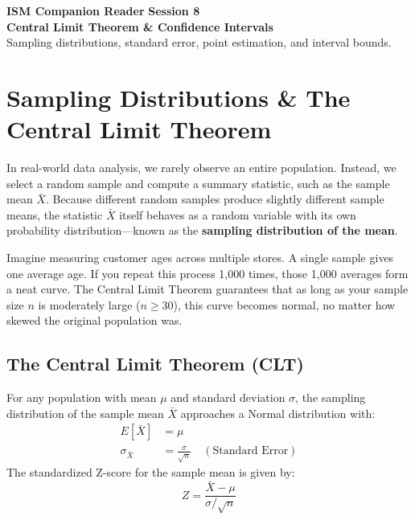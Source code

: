 \documentclass[10pt,a4paper]{article}
\begin{document}
\begin{tcolorbox}[enhanced, colback=brandink, colframe=brandink, arc=0pt, left=12pt, right=12pt, top=12pt, bottom=12pt]
  \color{white}
  \large\textbf{ISM Companion Reader} \hfill \textbf{Session 8}\\[4pt]
  \huge\textbf{Central Limit Theorem \& Confidence Intervals}\\[4pt]
  \small Sampling distributions, standard error, point estimation, and interval bounds.
\end{tcolorbox}

\vspace{10pt}

\section{Sampling Distributions \& The Central Limit Theorem}

In real-world data analysis, we rarely observe an entire population. Instead, we select a random sample and compute a summary statistic, such as the sample mean $\bar{X}$. Because different random samples produce slightly different sample means, the statistic $\bar{X}$ itself behaves as a random variable with its own probability distribution—known as the \textbf{sampling distribution of the mean}.

\begin{intuition}
Imagine measuring customer ages across multiple stores. A single sample gives one average age. If you repeat this process 1,000 times, those 1,000 averages form a neat curve. The Central Limit Theorem guarantees that as long as your sample size $n$ is moderately large ($n \ge 30$), this curve becomes normal, no matter how skewed the original population was.
\end{intuition}

\subsection{The Central Limit Theorem (CLT)}
For any population with mean $\mu$ and standard deviation $\sigma$, the sampling distribution of the sample mean $\bar{X}$ approaches a Normal distribution with:
\begin{align*}
E[\bar{X}] &= \mu \\
\sigma_{\bar{X}} &= \frac{\sigma}{\sqrt{n}} \quad (\text{Standard Error})
\end{align*}
The standardized Z-score for the sample mean is given by:
\[
Z = \frac{\bar{X} - \mu}{\sigma / \sqrt{n}}
\]
\end{document}
